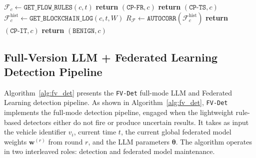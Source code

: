 \documentclass[12pt, a4paper]{report}
\begin{document}
\begin{algorithm}[H]
\caption{Lightweight Rule-Based Grey Hole Detection — Controller Plane (\texttt{LW-CP-Det})}
\begin{algorithmic}[1]
\small
{}
  \State $\mathcal{F}_c \gets \texttt{GET\_FLOW\_RULES}(c, t)$
      \State \textbf{return} $(\texttt{CP-FR}, c)$
    \EndIf
      \State \textbf{return} $(\texttt{CP-TS}, c)$
    \EndIf
  \EndFor
  \State $\mathcal{F}_c^{\text{hist}} \gets \texttt{GET\_BLOCKCHAIN\_LOG}(c, t, W)$
  \State $R_{\mathcal{F}} \gets \texttt{AUTOCORR}(\mathcal{F}_c^{\text{hist}})$
    \State \textbf{return} $(\texttt{CP-IT}, c)$
  \EndIf
  \State \textbf{return} $(\texttt{BENIGN}, c)$
\EndProcedure
\end{algorithmic}
\label{alg:lw_cp_det}
\end{algorithm}





\subsection{Full-Version LLM + Federated Learning Detection Pipeline}

Algorithm~\ref{alg:fv_det} presents the \texttt{FV-Det} full-mode LLM and Federated Learning detection pipeline. As shown in Algorithm~\ref{alg:fv_det},
\texttt{FV-Det} implements the full-mode detection pipeline,
engaged when the lightweight rule-based detectors either do not
fire or produce uncertain results. It takes as input the vehicle
identifier $v_i$, current time $t$, the current global federated model weights
$\mathbf{w}^{(r)}$ from round $r$, and the LLM parameters $\boldsymbol{\theta}$.
The algorithm operates in two interleaved roles: detection and federated model
maintenance.
\end{document}
